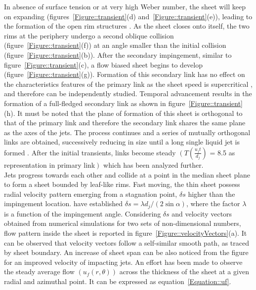 \documentclass{jfm}
\begin{document}
In absence of surface tension or at very high Weber number, the sheet will keep on expanding (figures~\ref{Figure::transient}(d) and~\ref{Figure::transient}(e)), leading to the formation of the open rim structures \citep{taylor1960formation,chen2013high}. As the sheet closes onto itself, the two rims at the periphery undergo a second oblique collision (figure~\ref{Figure::transient}(f)) at an angle smaller than the initial collision (figure~\ref{Figure::transient}(b)). After the secondary impingement, similar to figure~\ref{Figure::transient}(c), a flow biased sheet begins to develop (figure~\ref{Figure::transient}(g)). Formation of this secondary link has no effect on the characteristics features of the primary link as the sheet speed is supercritical \citep{bush2004collision}, and therefore can be independently studied. Temporal advancement results in the formation of a full-fledged secondary link as shown in figure~\ref{Figure::transient}(h). It must be noted that the plane of formation of this sheet is orthogonal to that of the primary link and therefore the secondary link shares the same plane as the axes of the jets. The process continues and a series of mutually orthogonal links are obtained, successively reducing in size until a long single liquid jet is formed \citep{bush2004collision}. After the initial transients, links become steady $\left(T\right. \left(\frac{u_jt}{d_j}\right) $ = 8.5 as representation in primary link$\left.\right)$ which has been analyzed further. \\
Jets progress towards each other and collide at a point in the median sheet plane to form a sheet bounded by leaf-like rims. Fast moving, the thin sheet possess radial velocity pattern emerging from a stagnation point, $\delta s$ higher than the impingement location. \cite{inamura2014effect} have established $\delta s = \lambda d_j/(2\sin\alpha)$, where the factor $\lambda$ is a function of the impingement angle. Considering $\delta s$ and velocity vectors obtained from numerical simulations for two sets of non-dimensional numbers, flow pattern inside the sheet is reported in figure~\ref{Figure::velocityVectors}(a). It can be observed that velocity vectors follow a self-similar smooth path, as traced by sheet boundary. An increase of sheet span can be also noticed from the figure for an improved velocity of impacting jets.  
An effort has been made to observe the steady average flow $\left(u_f(r,\theta)\right)$ across the thickness of the sheet at a given radial and azimuthal point. It can be expressed as equation~\ref{Equation::uf}. 
\end{document}
